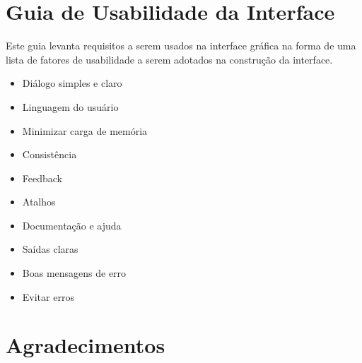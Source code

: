 \documentclass[a4paper,10pt]{report}
\begin{document}
\section{Guia de Usabilidade da Interface}

Este guia levanta requisitos a serem usados na interface gráfica na forma de uma lista de fatores de usabilidade a serem adotados na construção da interface. 

\begin{itemize}
 \item Diálogo simples e claro 
 \item Linguagem do usuário
 \item Minimizar carga de memória
 \item Consistência
 \item Feedback
 \item Atalhos
 \item Documentação e ajuda
 \item Saídas claras
 \item Boas mensagens de erro
 \item Evitar erros
\end{itemize}

\section*{Agradecimentos}


\end{document}
